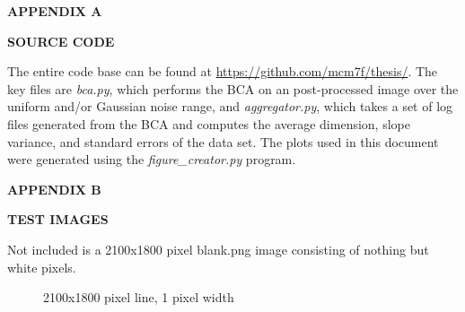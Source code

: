\documentclass[12pt, oneside]{book}
\begin{document}
\clearpage

\begin{center}
\textbf{APPENDIX A}

\textbf{SOURCE CODE}
\end{center}
The entire code base can be found at \url{https://github.com/mcm7f/thesis/}.  The key files are \textit{bca.py}, which performs the BCA on an post-processed image over the uniform and/or Gaussian noise range, and \textit{aggregator.py}, which takes a set of log files generated from the BCA and computes the average dimension, slope variance, and standard errors of the data set.  The plots used in this document were generated using the \textit{figure\_creator.py} program.



\clearpage

%
% 
\begin{center}
\textbf{APPENDIX B}

\textbf{TEST IMAGES}
\end{center}

Not included is a 2100x1800 pixel blank.png image consisting of nothing but white pixels.

\begin{figure}[!b]
  \centering
  \caption[2100x1800 pixel line]{2100x1800 pixel line, 1 pixel width}
  \label{fig:line_png}
\end{figure}
\end{document}
